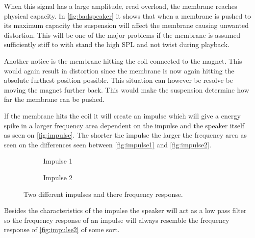 When this signal has a large amplitude, read overload, the membrane reaches physical capacity. In \autoref{fig:badspeaker} it shows that when a membrane is pushed to its maximum capacity the suspension will affect the membrane causing unwanted distortion. This will be one of the major problems if the membrane is assumed sufficiently stiff to with stand the high \gls{SPL} and not twist during playback. 

Another notice is the membrane hitting the coil connected to the magnet. This would again result in distortion since the membrane is now again hitting the absolute furthest position possible. This situation can however be resolve be moving the magnet further back. This would make the suspension determine how far the membrane can be pushed.

% 


If the membrane hits the coil it will create an impulse which will give a energy spike in a larger frequency area dependent on the impulse and the speaker itself as seen on \autoref{fig:impulse}. The shorter the impulse the larger the frequency area as seen on the differences seen between \autoref{fig:impulse1} and \autoref{fig:impulse2}.  

\begin{figure}[H]
\begin{subfigure}[t]{0.47\textwidth}
\centering
{}
\scalebox{0.6}{
}
\caption{Impulse 1}
\label{fig:impulse1}
\end{subfigure}
\hspace{6mm} 
\begin{subfigure}[t]{0.47\textwidth}
\centering
{}
\scalebox{0.6}{
}
\caption{Impulse 2}
\label{fig:impulse2}
\end{subfigure}
\caption{Two different impulses and there frequency response.}
\label{fig:impulse}
\end{figure}
Besides the characteristics of the impulse the speaker will act as a low pass filter so the frequency response of an impulse will always resemble the frequency response of \autoref{fig:impulse2} of some sort.   


